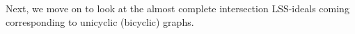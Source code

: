 \documentclass[11pt,a4paper,reqno]{amsart}
\theoremstyle{definition}
\numberwithin{equation}{section}
\DeclareMathOperator{\pmd}{pmd}
\begin{document}
    

Next, we move on to look at the almost complete intersection LSS-ideals coming corresponding to unicyclic (bicyclic) graphs.
\end{document}
